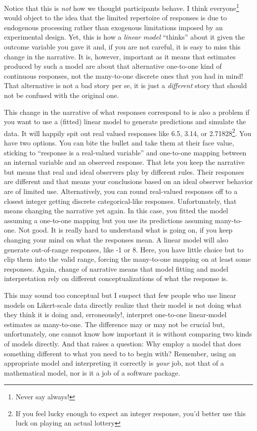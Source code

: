 \documentclass[
]{book}
\begin{document}
Notice that this is \emph{not} how we thought participants behave. I think everyone\footnote{Never say always!} would object to the idea that the limited repertoire of responses is due to endogenous processing rather than exogenous limitations imposed by an experimental design. Yet, this is how a \emph{linear model} ``thinks'' about it given the outcome variable you gave it and, if you are not careful, it is easy to miss this change in the narrative. It is, however, important as it means that estimates produced by such a model are about that alternative one-to-one kind of continuous responses, not the many-to-one discrete ones that you had in mind! That alternative is not a bad story per se, it is just a \emph{different} story that should not be confused with the original one.

This change in the narrative of what responses correspond to is also a problem if you want to use a (fitted) linear model to generate predictions and simulate the data. It will happily spit out real valued responses like 6.5, 3.14, or 2.71828\footnote{If you feel lucky enough to expect an integer response, you'd better use this luck on playing an actual lottery}. You have two options. You can bite the bullet and take them at their face value, sticking to ``response is a real-valued variable'' and one-to-one mapping between an internal variable and an observed response. That lets you keep the narrative but means that real and ideal observers play by different rules. Their responses are different and that means your conclusions based on an ideal observer behavior are of limited use. Alternatively, you can round real-valued responses off to a closest integer getting discrete categorical-like responses. Unfortunately, that means changing the narrative yet again. In this case, you fitted the model assuming a one-to-one mapping but you use its predictions assuming many-to-one. Not good. It is really hard to understand what is going on, if you keep changing your mind on what the responses mean. A linear model will also generate out-of-range responses, like -1 or 8. Here, you have little choice but to clip them into the valid range, forcing the many-to-one mapping on at least some responses. Again, change of narrative means that model fitting and model interpretation rely on different conceptualizations of what the response is.

This may sound too conceptual but I suspect that few people who use linear models on Likert-scale data directly realize that their model is not doing what they think it is doing and, erroneously!, interpret one-to-one linear-model estimates as many-to-one. The difference may or may not be crucial but, unfortunately, one cannot know how important it is without comparing two kinds of models directly. And that raises a question: Why employ a model that does something different to what you need to to begin with? Remember, using an appropriate model and interpreting it correctly is \emph{your} job, not that of a mathematical model, nor is it a job of a software package.
\end{document}
